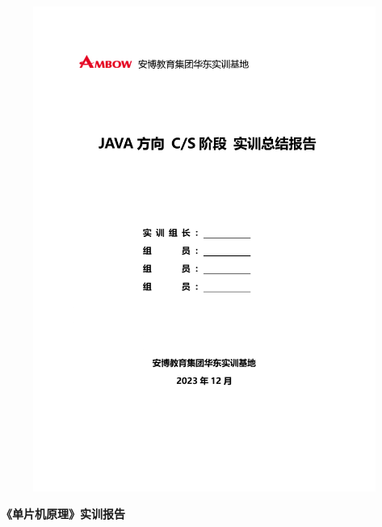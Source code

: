 \pagestyle{bianyi} %
 
 
 
 
 
\vspace{2cm}
  \begin{figure}[h]
 	\centering
 	\includegraphics[scale=1]{Fig/logo.pdf}
 \end{figure}
 \vspace{1cm}
 
\begin{center}
	\textbf{\bfheiti {}《单片机原理》实训报告}
\end{center}
 

